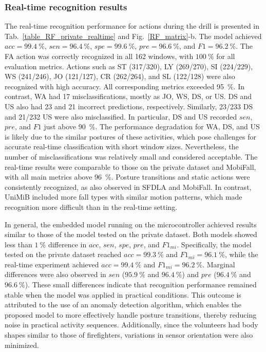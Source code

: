 \documentclass[journal,twoside,web]{ieeecolor}
\begin{document}
\subsubsection{Real-time recognition results}
The real-time recognition performance for actions during the drill is presented in Tab.~\ref{table_RF_private_realtime} and Fig.~\ref{RF_matrix}-b. The model achieved $acc=99.4~\%$, $sen=96.4~\%$, $spe=99.6~\%$, $pre=96.6~\%$, and $F1=96.2~\%$. The FA action was correctly recognized in all 162 windows, with $100~\%$ for all evaluation metrics. Actions such as ST (317/320), LY (269/270), SI (224/229), WS (241/246), JO (121/127), CR (262/264), and SL (122/128) were also recognized with high accuracy. All corresponding metrics exceeded 95~\%. In contrast, WA had 17 misclassifications, mostly as JO, WS, DS, or US. DS and US also had 23 and 21 incorrect predictions, respectively. Similarly, 23/233 DS and 21/232 US were also misclassified. In particular, DS and US recorded $sen$, $pre$, and $F1$ just above 90~\%. The performance degradation for WA, DS, and US is likely due to the similar postures of these activities, which pose challenges for accurate real-time classification with short window sizes. Nevertheless, the number of misclassifications was relatively small and considered acceptable. The real-time results were comparable to those on the private dataset and MobiFall, with all main metrics above 96~\%. Posture transitions and static actions were consistently recognized, as also observed in SFDLA and MobiFall. In contrast, UniMiB included more fall types with similar motion patterns, which made recognition more difficult than in the real-time setting.

In general, the embedded model running on the microcontroller achieved results similar to those of the model tested on the private dataset. Both models showed less than $1~\%$ difference in $acc$, $sen$, $spe$, $pre$, and $F1_{mi}$. Specifically, the model tested on the private dataset reached $acc=99.3~\%$ and $F1_{mi}=96.1~\%$, while the real-time experiment achieved $acc=99.4~\%$ and $F1_{mi}=96.2~\%$. Marginal differences were also observed in $sen$ ($95.9~\%$ and $96.4~\%$) and $pre$ ($96.4~\%$ and $96.6~\%$). These small differences indicate that recognition performance remained stable when the model was applied in practical conditions. This outcome is attributed to the use of an anomaly detection algorithm, which enables the proposed model to more effectively handle posture transitions, thereby reducing noise in practical activity sequences. Additionally, since the volunteers had body shapes similar to those of firefighters, variations in sensor orientation were also minimized.
\end{document}
